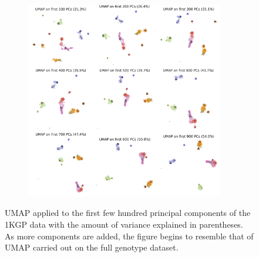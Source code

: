 \documentclass[12pt]{pnas-new}
\begin{document}
\begin{figure}
    \centering
    \begin{subfigure}{0.95\textwidth}
    \includegraphics[width=0.95\textwidth]{images/montage_1KGP_umap_convergence_resize.jpeg}
    \end{subfigure}
    \caption{UMAP applied to the first few hundred principal components of the 1KGP data with the amount of variance explained in parentheses. As more components are added, the figure begins to resemble that of UMAP carried out on the full genotype dataset.}
    \label{fig:supp_montage_1kgp_converge}
\end{figure}
\end{document}
